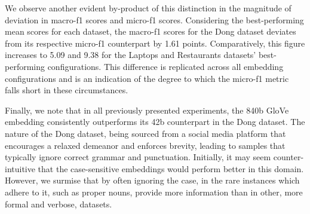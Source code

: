 \documentclass[../../fyp.tex]{subfiles}
\begin{document}
We observe another evident by-product of this distinction in the magnitude of deviation in macro-f1 scores and micro-f1 scores. Considering the best-performing mean scores for each dataset, the macro-f1 scores for the Dong dataset deviates from its respective micro-f1 counterpart by 1.61 points. Comparatively, this figure increases to 5.09 and 9.38 for the Laptops and Restaurants datasets' best-performing configurations. This difference is replicated across all embedding configurations and is an indication of the degree to which the micro-f1 metric falls short in these circumstances.

Finally, we note that in all previously presented experiments, the 840b GloVe embedding consistently outperforms its 42b counterpart in the Dong dataset. The nature of the Dong dataset, being sourced from a social media platform that encourages a relaxed demeanor and enforces brevity, leading to samples that typically ignore correct grammar and punctuation. Initially, it may seem counter-intuitive that the case-sensitive embeddings would perform better in this domain. However, we surmise that by often ignoring the case, in the rare instances which adhere to it, such as proper nouns, provide more information than in other, more formal and verbose, datasets. 
\end{document}
